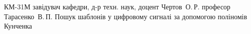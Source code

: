 \documentclass{thesis_utf8}
\begin{document}
    {КМ-31М}
    {завідувач кафедри, д-р техн. наук, доцент Чертов~О.\,Р.}
    {професор Тарасенко~В.\,П.}
    {Пошук шаблонів у цифровому сигналі за допомогою поліномів Кунченка}

\tableofcontents







\end{document}
